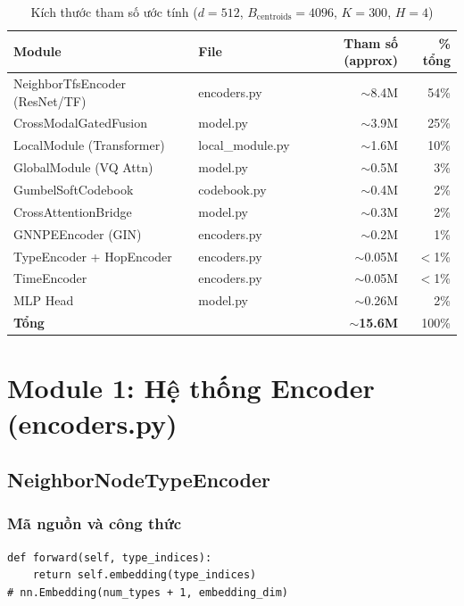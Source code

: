 \documentclass[12pt,a4paper]{article}
\begin{document}
\begin{table}[H]
\centering\small
\caption{Kích thước tham số ước tính ($d=512$, $B_\text{centroids}=4096$, $K=300$, $H=4$)}
\begin{tabular}{llrr}
\toprule
\textbf{Module} & \textbf{File} & \textbf{Tham số (approx)} & \textbf{\% tổng} \\
\midrule
NeighborTfsEncoder (ResNet/TF) & encoders.py & $\sim$8.4M & 54\% \\
CrossModalGatedFusion & model.py & $\sim$3.9M & 25\% \\
LocalModule (Transformer) & local\_module.py & $\sim$1.6M & 10\% \\
GlobalModule (VQ Attn) & model.py & $\sim$0.5M & 3\% \\
GumbelSoftCodebook & codebook.py & $\sim$0.4M & 2\% \\
CrossAttentionBridge & model.py & $\sim$0.3M & 2\% \\
GNNPEEncoder (GIN) & encoders.py & $\sim$0.2M & 1\% \\
TypeEncoder + HopEncoder & encoders.py & $\sim$0.05M & $<$1\% \\
TimeEncoder & encoders.py & $\sim$0.05M & $<$1\% \\
MLP Head & model.py & $\sim$0.26M & 2\% \\
\midrule
\textbf{Tổng} & & $\sim$\textbf{15.6M} & 100\% \\
\bottomrule
\end{tabular}
\end{table}

\section{Module 1: Hệ thống Encoder (encoders.py)}

\subsection{NeighborNodeTypeEncoder}

\subsubsection{Mã nguồn và công thức}

\begin{codebox}[title={encoders.py -- NeighborNodeTypeEncoder.forward()}]
\begin{lstlisting}
def forward(self, type_indices):
    return self.embedding(type_indices)
# nn.Embedding(num_types + 1, embedding_dim)
\end{lstlisting}
\end{codebox}
\end{document}
